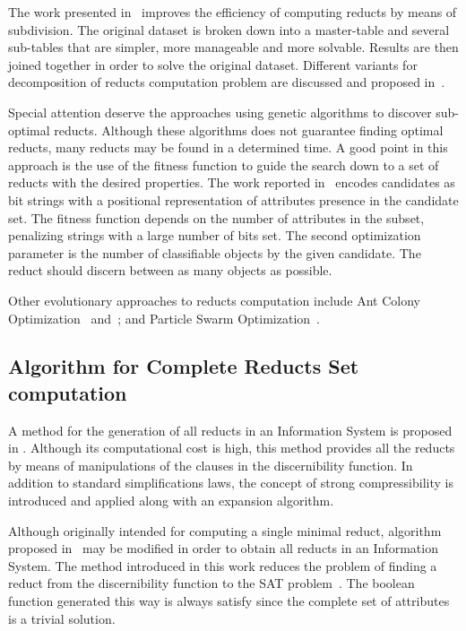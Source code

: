 \documentclass[11pt]{article}   %
\begin{document}
  The work presented in~\cite{Jiao10} improves the efficiency of computing reducts by means of subdivision. The 
  original dataset is broken down into a master-table and several sub-tables that are simpler, more manageable 
  and more solvable. Results are then joined together in order to solve the original dataset. Different variants
  for decomposition of reducts computation problem are discussed and proposed in~\cite{Strakowski08}.
  
  Special attention deserve the approaches using genetic algorithms to discover sub-optimal reducts. Although 
  these algorithms does not guarantee finding optimal reducts, many reducts may be found in a determined time.
  A good point in this approach is the use of the fitness function to guide the search down to a set of 
  reducts with the desired properties. The work reported in~\cite{Wroblewski95} encodes candidates as bit 
  strings with a positional representation of attributes presence in the candidate set. The fitness function
  depends on the number of attributes in the subset, penalizing strings with a large number of bits set. The 
  second optimization parameter is the number of classifiable objects by the given candidate. The reduct should 
  discern between as many objects as possible.
  
  Other evolutionary approaches to reducts computation include Ant Colony Optimization~\cite{Jensen03}
  and~\cite{Chen10}; and Particle Swarm Optimization~\cite{Wang07}.
    
\subsection{Algorithm for Complete Reducts Set computation}
  A method for the generation of all reducts in an Information System is proposed in \cite{Starzyk99,Starzyk00}.
  Although its computational cost is high, this method provides all the reducts by means of manipulations of 
  the clauses in the discernibility function. In addition to standard simplifications laws, the concept of 
  strong compressibility is introduced and applied along with an expansion algorithm.
  
  Although originally intended for computing a single minimal reduct, algorithm proposed in~\cite{Jensen14} may be
  modified in order to obtain all reducts in an Information System. The method introduced in this work reduces
  the problem of finding a reduct from the discernibility function to the SAT problem~\cite{Davis62}. The boolean
  function generated this way is always satisfy since the complete set of attributes is a trivial solution.
  
\end{document}

